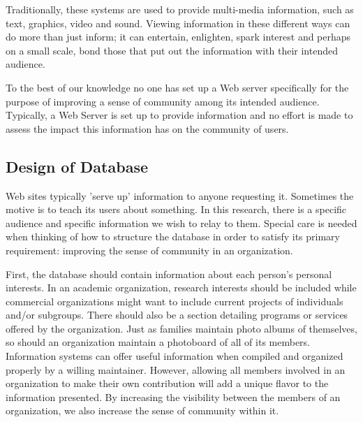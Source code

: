 Traditionally, these systems are used to provide multi-media information, such
as text, graphics, video and sound.  Viewing information in these different
ways can do more than just inform; it can entertain, enlighten, spark interest
and perhaps on a small scale, bond those that put out the information with
their intended audience.

To the best of our knowledge no one has set up a Web server specifically for
the purpose of improving a sense of community among its intended audience.
Typically, a Web Server is set up to provide information and no effort is made
to assess the impact this information has on the community of users.  

\subsection{Design of Database}
Web sites typically 'serve up' information to anyone requesting it.
Sometimes the motive is to teach its users about something.  In this
research, there is a specific audience and specific information we wish to
relay to them.  Special care is needed when thinking of how to structure
the database in order to satisfy its primary requirement: improving the
sense of community in an organization.

First, the database should contain information about each person's personal
interests.  In an academic organization, research interests should be included
while commercial organizations might want to include current projects of
individuals and/or subgroups.  There should also be a section detailing
programs or services offered by the organization.  Just as families maintain
photo albums of themselves, so should an organization maintain a photoboard of
all of its members.  Information systems can offer useful information when
compiled and organized properly by a willing maintainer.  However, allowing all
members involved in an organization to make their own contribution will add a
unique flavor to the information presented.  By increasing the visibility
between the members of an organization, we also increase the sense of community
within it.

